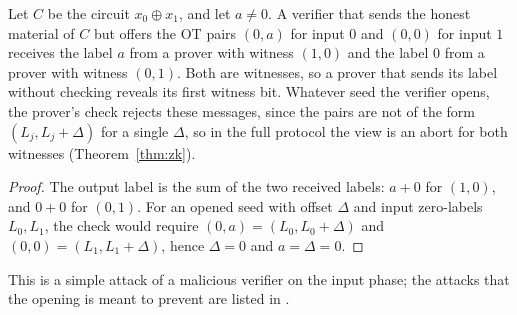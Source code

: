 \begin{proposition}
  \label{prop:no-check-leaks}
  \leanok
  Let $C$ be the circuit $x_0 \oplus x_1$, and let $a \neq 0$. A verifier that sends the honest
  material of $C$ but offers the OT pairs $(0, a)$ for input $0$ and $(0, 0)$ for input $1$ receives
  the label $a$ from a prover with witness $(1, 0)$ and the label $0$ from a prover with witness
  $(0, 1)$. Both are witnesses, so a prover that sends its label without checking reveals its first
  witness bit. Whatever seed the verifier opens, the prover's check rejects these messages, since
  the pairs are not of the form $(L_j, L_j + \Delta)$ for a single $\Delta$, so in the full protocol
  the view is an abort for both witnesses (Theorem~\ref{thm:zk}).
\end{proposition}

\begin{proof}
  \leanok
  The output label is the sum of the two received labels: $a + 0$ for $(1, 0)$, and $0 + 0$ for
  $(0, 1)$. For an opened seed with offset $\Delta$ and input zero-labels $L_0, L_1$, the check would
  require $(0, a) = (L_0, L_0 + \Delta)$ and $(0, 0) = (L_1, L_1 + \Delta)$, hence $\Delta = 0$ and
  $a = \Delta = 0$.
\end{proof}

This is a simple attack of a malicious verifier on the input phase; the attacks that the opening
is meant to prevent are listed in \cite[Sect.~1]{JKO13}.
